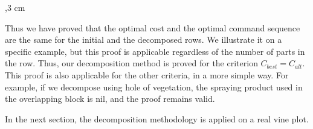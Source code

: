 ,3 cm


Thus we have proved that the optimal cost and the optimal command sequence are the same for the initial and the decomposed rows. We illustrate it on a specific example, but this proof is applicable regardless of the number of parts in the row. Thus, our decomposition method is proved for the criterion $C_{best}=C_{alt}$. This proof is also applicable for the other criteria, in a more simple way. For example, if we decompose using hole of vegetation, the spraying product used in the overlapping block is nil, and the proof remains valid.

In the next section, the decomposition methodology is applied on a real vine plot.

